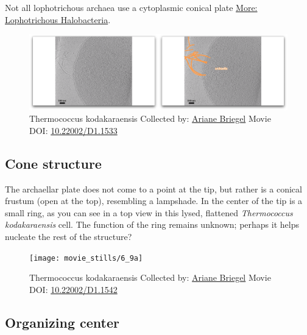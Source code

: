 \documentclass[]{tufte-book}
\begin{document}
Not all lophotrichous archaea use a cytoplasmic conical plate
\protect\hyperlink{Lophotrichous_Halobacteria}{More: Lophotrichous
Halobacteria}.





\begin{figure}
\includegraphics{movie_stills/6_9} \caption[Thermococcus kodakaraensis Collected by:
\protect\hyperlink{ariane_briegel}{Ariane Briegel} Movie DOI:
\href{https://doi.org/10.22002/D1.1533}{10.22002/D1.1533}]{Thermococcus kodakaraensis Collected by:
\protect\hyperlink{ariane_briegel}{Ariane Briegel} Movie DOI:
\href{https://doi.org/10.22002/D1.1533}{10.22002/D1.1533}}\label{fig:6-9}
\end{figure}

\hypertarget{Cone_structure}{\subsection{Cone
structure}\label{Cone_structure}}

The archaellar plate does not come to a point at the tip, but rather is
a conical frustum (open at the top), resembling a lampshade. In the
center of the tip is a small ring, as you can see in a top view in this
lysed, flattened \emph{Thermococcus kodakaraensis} cell. The function of
the ring remains unknown; perhaps it helps nucleate the rest of the
structure?





\begin{figure}
\texttt{[image: movie\_stills/6\_9a]} \caption[Thermococcus kodakaraensis Collected by:
\protect\hyperlink{ariane_briegel}{Ariane Briegel} Movie DOI:
\href{https://doi.org/10.22002/D1.1542}{10.22002/D1.1542}]{Thermococcus kodakaraensis Collected by:
\protect\hyperlink{ariane_briegel}{Ariane Briegel} Movie DOI:
\href{https://doi.org/10.22002/D1.1542}{10.22002/D1.1542}}\label{fig:6-9a}
\end{figure}

\hypertarget{Organizing_center}{\subsection{Organizing
center}\label{Organizing_center}}
\end{document}
